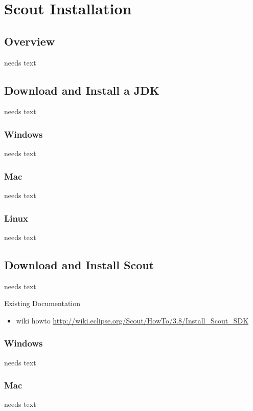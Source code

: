 \documentclass[a4paper,10pt,twoside]{book}
\begin{document}
  \sloppy
\fi


\chapter{Scout Installation}

\section{Overview}
needs text

\section{Download and Install a JDK}
needs text

\subsection{Windows}
needs text

\subsection{Mac}
needs text

\subsection{Linux}
needs text

\section{Download and Install Scout}
needs text

\noindent Existing Documentation
\begin{itemize}
  \item wiki howto \url{http://wiki.eclipse.org/Scout/HowTo/3.8/Install_Scout_SDK}
\end{itemize}

\subsection{Windows}
needs text

\subsection{Mac}
needs text
\end{document}
